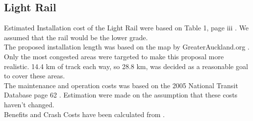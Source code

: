 \documentclass[twoside, a4paper, 11pt]{article}
\begin{document}
\newpage
\subsection{Light Rail}
Estimated Installation cost of the Light Rail were based on Table 1, page iii \citep{ATND_3}. We assumed that the rail would be the lower grade. \\

The proposed installation length was based on the map by GreaterAuckland.org \citep{MattL13}. Only the most congested areas were targeted to make this proposal more realistic. 14.4 km of track each way, so 28.8 km, was decided as a reasonable goal to cover these areas.\\

The maintenance and operation costs was based on the 2005 National Transit Database page 62 \citep{nightowler12}. Estimation were made on the assumption that these costs haven't changed.\\

Benefits and Crash Costs have been calculated from \cite[p.~45]{wallis15}.\\



\end{document}
